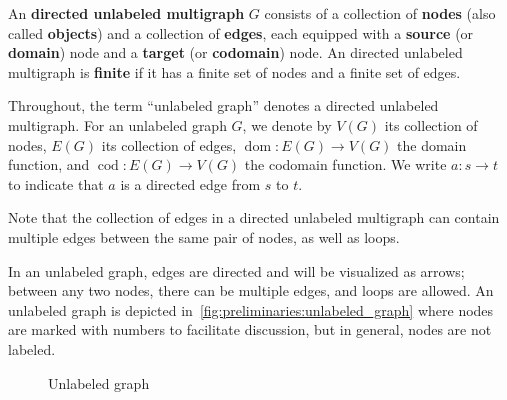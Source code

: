 \begin{definition}
    \label{def:graph:unlabeled}
    An \textbf{directed unlabeled multigraph} \( G \) consists of a collection of \textbf{nodes} (also called \textbf{objects}) and a collection of \textbf{edges}, each equipped with a \textbf{source} (or \textbf{domain}) node and a \textbf{target} (or \textbf{codomain}) node. 
    An directed unlabeled multigraph is \textbf{finite} if
    it has a finite set of nodes and a finite set of edges.

    Throughout, the term \enquote{unlabeled graph} denotes a directed unlabeled multigraph.
    For an unlabeled graph \( G \), we denote by \( V(G) \) its collection of nodes, \( E(G) \) its collection of edges, \( \operatorname{dom}: E(G) {\to}V(G) \) the domain function, and \( \operatorname{cod}:E(G) {\to} V(G) \) the codomain function. 
    We write \( a: s \to t \) to indicate that \( a \) is a directed edge from \( s \) to \( t \).
\end{definition}   

Note that the collection of edges in a directed unlabeled multigraph can contain multiple edges between the same pair of nodes, as well as loops.

\begin{example}
    In an unlabeled graph, edges are directed and will be visualized as arrows; between any two nodes, there can be multiple edges, and loops are allowed. An unlabeled graph is depicted in~\autoref{fig:preliminaries:unlabeled_graph} where nodes are marked with numbers to facilitate discussion, but in general, nodes are not labeled.
    \begin{figure}[!ht]
        \centering
    \caption{Unlabeled graph}
    \label{fig:preliminaries:unlabeled_graph}
    \end{figure}
\end{example}